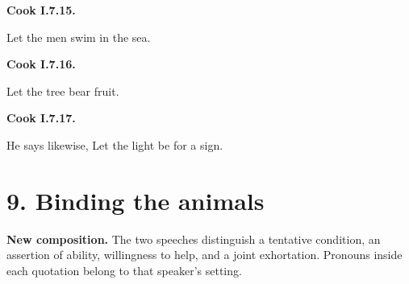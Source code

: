\par\begin{minipage}{\linewidth}\raggedright
\textbf{Cook I.7.15.}

Let the men swim in the sea.

\end{minipage}\par\addvspace{4pt}

\par\begin{minipage}{\linewidth}\raggedright
\textbf{Cook I.7.16.}

Let the tree bear fruit.

\end{minipage}\par\addvspace{4pt}

\par\begin{minipage}{\linewidth}\raggedright
\textbf{Cook I.7.17.}

He says likewise, Let the light be for a sign.

\end{minipage}\par\addvspace{4pt}

\section*{9. Binding the animals}

\textbf{New composition.} The two speeches distinguish a tentative condition, an assertion of ability, willingness to help, and a joint exhortation. Pronouns inside each quotation belong to that speaker’s setting.

\par\begin{minipage}{\linewidth}\raggedright
{}
\end{minipage}\par

